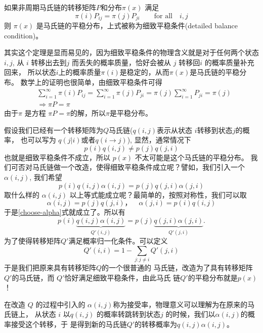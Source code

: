 \begin{theorem}[细致平稳条件]
如果非周期马氏链的转移矩阵$P$和分布$\pi(x)$ 满足
\begin{equation}
\pi(i)P_{ij} = \pi(j)P_{ji} \quad\quad \text{for all} \quad i,j
\end{equation}
则 $\pi(x)$ 是马氏链的平稳分布，上式被称为细致平稳条件(detailed balance condition)。
\end{theorem}

其实这个定理是显而易见的，因为细致平稳条件的物理含义就是对于任何两个状态$i,j$,
从 $i$ 转移出去到$j$ 而丢失的概率质量，恰好会被从 $j$ 转移回$i$ 的概率质量补充回来，
所以状态$i$上的概率质量$\pi(i)$是稳定的，从而$\pi(x)$是马氏链的平稳分布。
数学上的证明也很简单，由细致平稳条件可得
\begin{align*}
& \sum_{i=1}^\infty \pi(i)P_{ij} = \sum_{i=1}^\infty \pi(j)P_{ji}
= \pi(j) \sum_{i=1}^\infty P_{ji} = \pi(j) \\
& \Rightarrow \pi P = \pi
\end{align*}
由于$\pi$ 是方程 $\pi P = \pi$的解，所以$\pi$是平稳分布。


假设我们已经有一个转移矩阵为$Q$马氏链($q(i,j)$表示从状态 $i$转移到状态$j$的概率，
也可以写为 $q(j|i)$或者$q(i\rightarrow j)$),
显然，通常情况下
$$ p(i) q(i,j) \neq p(j) q(j,i) $$
也就是细致平稳条件不成立，所以 $p(x)$ 不太可能是这个马氏链的平稳分布。
我们可否对马氏链做一个改造，使得细致平稳条件成立呢？譬如，我们引入一个 $\alpha(i,j)$,
我们希望
\begin{equation}
\label{choose-alpha}
 p(i) q(i,j)\alpha(i,j) = p(j) q(j,i)\alpha(j,i)
\end{equation}
取什么样的 $\alpha(i,j)$ 以上等式能成立呢？最简单的，按照对称性，我们可以取
$$ \alpha(i,j)= p(j) q(j,i)， \quad \alpha(j,i) = p(i) q(i,j)$$
于是\eqref{choose-alpha}式就成立了。所以有
\begin{equation}
\label{detailed-balance}
p(i) \underbrace{q(i,j)\alpha(i,j)}_{Q'(i,j)}
= p(j) \underbrace{q(j,i)\alpha(j,i)}_{Q'(j,i)} .
\end{equation}
为了使得转移矩阵$Q'$满足概率归一化条件。可以定义
$$ Q'(i,i) = 1- \sum_{j:j \neq i}  Q'(j, i) $$
于是我们把原来具有转移矩阵$Q$的一个很普通的
马氏链，改造为了具有转移矩阵$Q'$的马氏链，而 $Q'$恰好满足细致平稳条件，由此马氏
链$Q'$的平稳分布就是$p(x)$！

在改造 $Q$ 的过程中引入的 $\alpha(i,j)$称为接受率，物理意义可以理解为在原来的马氏链上，
从状态 $i$ 以$q(i,j)$ 的概率转跳转到状态$j$ 的时候，我们以$\alpha(i,j)$的概率接受这个转移，于
是得到新的马氏链$Q'$的转移概率为$q(i,j)\alpha(i,j)$。

